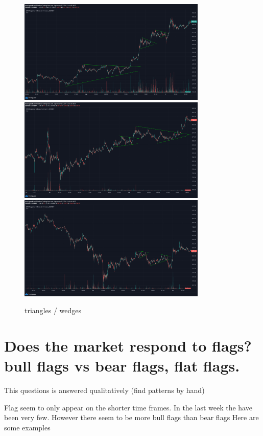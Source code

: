 \begin{figure}[H]
\center
\includegraphics[width=0.8\textwidth]{fig/tri/t4.png}
\includegraphics[width=0.8\textwidth]{fig/tri/t5.png}
\includegraphics[width=0.8\textwidth]{fig/tri/t6.png}
\caption{triangles / wedges}
\end{figure}
\section{ Does the market respond to flags? bull flags vs bear flags, flat flags. }

This questions is answered qualitatively (find patterns by hand)

Flag seem to only appear on the shorter time frames. In the last week the have been very few.
However there seem to be more bull flags than bear flags
Here are some examples

